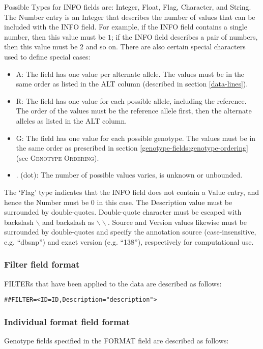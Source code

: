 \documentclass[8pt]{article}
\begin{document}
Possible Types for INFO fields are: Integer, Float, Flag, Character, and
String. 
The Number entry is an Integer that describes the number of values that
can be included with the INFO field. For example, if the INFO field contains a
single number, then this value must be $1$; if the INFO field describes a
pair of numbers, then this value must be $2$ and so on. There are also
certain special characters used to define special cases:

\begin{itemize}
  \item A: The field has one value per alternate allele. The values must be in the same order as listed in the ALT column (described in section \ref{data-lines}).
  \item R: The field has one value for each possible allele, including the reference. The order of the values must be the reference allele first, then the alternate alleles as listed in the ALT column.
  \item G: The field has one value for each possible genotype. The values must be in the same order as prescribed in section \ref{genotype-fields:genotype-ordering} (see \textsc{Genotype Ordering}).
  \item . (dot): The number of possible values varies, is unknown or unbounded.
\end{itemize}

The `Flag' type indicates that the INFO field does not contain a Value entry, and hence the Number must be $0$ in this case. The Description value must be surrounded by double-quotes. Double-quote character must be escaped with backslash $\backslash$ and backslash as $\backslash\backslash$. Source and Version values likewise must be surrounded by double-quotes and specify the annotation source (case-insensitive, e.g. ``dbsnp'') and exact version (e.g. ``138''), respectively for computational use.

\subsubsection{Filter field format}
FILTERs that have been applied to the data are described as follows:

\begin{verbatim}
##FILTER=<ID=ID,Description="description">
\end{verbatim}

\subsubsection{Individual format field format}
Genotype fields specified in the FORMAT field are described as follows:
\end{document}
